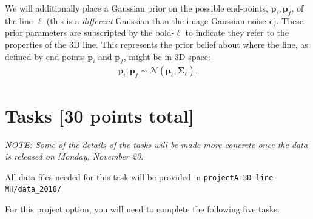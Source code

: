 \documentclass[10pt]{article}
\begin{document}
We will additionally place a Gaussian prior on the possible end-points, $\mathbf{p}_i, \mathbf{p}_f$, of the line $\boldsymbol{\ell}$ (this is a {\em different} Gaussian than the image Gaussian noise $\boldsymbol{\epsilon}$).  These prior parameters are subscripted by the bold-$\boldsymbol{\ell}$ to indicate they refer to the properties of the 3D line.  This represents the prior belief about where the line, as defined by end-points $\mathbf{p}_i$ and $\mathbf{p}_f$, might be in 3D space:
\begin{eqnarray*}
\mathbf{p}_i, \mathbf{p}_f \sim \mathcal{N}(\boldsymbol{\mu}_{\boldsymbol{\ell}}, \boldsymbol{\Sigma}_{\boldsymbol{\ell}}) .
\end{eqnarray*}

\newpage
\section*{Tasks [30 points total]}

{\em NOTE: Some of the details of the tasks will be made more concrete once the data is released on Monday, November 20.}

All data files needed for this task will be provided in {\tt projectA-3D-line-MH/data\_2018/}

For this project option, you will need to complete the following five tasks:
\end{document}
